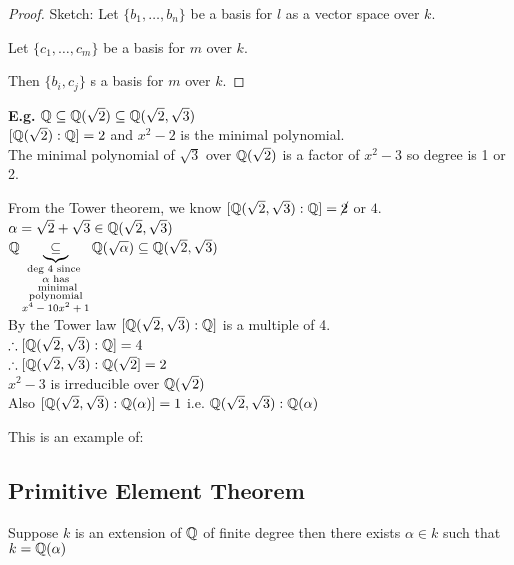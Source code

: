 \documentclass[11pt]{article}
\begin{document}
\begin{proof}
	Sketch: Let $\{ b_1, \dots, b_n \}$ be a basis for $l$ as a vector space over $k$.

	Let $\{c_1, \dots, c_m \}$ be a basis for $m$ over $k$.

	Then $\{ b_i, c_j\}$ s a basis for $m$ over $k$.
\end{proof}
$ $\\
\textbf{E.g.} $\mathbb{Q} \subseteq \mathbb{Q}(\sqrt{2}) \subseteq \mathbb{Q}(\sqrt{2},\sqrt{3}) $
$ $\\[-0.5em]

$[\mathbb{Q}(\sqrt{2}) : \mathbb{Q}] = 2 $ and $x^2 - 2$ is the minimal polynomial.
$ $\\[-0.5em]

The minimal polynomial of $\sqrt{3} $ over $\mathbb{Q}(\sqrt{2})$ is a factor of $x^2 -3$ so degree is 1 or 2.

From the Tower theorem, we know $[\mathbb{Q}(\sqrt{2},\sqrt{3}):\mathbb{Q}] = \cancel{2}$ or $4$.
$ $\\[-.5em]

$\alpha = \sqrt{2} + \sqrt{3} \in \mathbb{Q} (\sqrt{2}, \sqrt{3})$
$ $\\[-.5em]

$\mathbb{Q} \underbrace{\subseteq}_{\substack{\text{deg 4 since } \\ \text{$\alpha$ has} \\ \text{ minimal} \\ \text{polynomial}\\ \text{$x^4 -10x^2 + 1$} }} \mathbb{Q}(\sqrt{\alpha}) \subseteq \mathbb{Q}(\sqrt{2},\sqrt{3}) $
$ $\\

By the Tower law $[\mathbb{Q}(\sqrt{2},\sqrt{3}): \mathbb{Q}]$ is a multiple of 4.
$ $\\[-.5em]

$ \therefore [\mathbb{Q}(\sqrt{2},\sqrt{3}): \mathbb{Q}] = 4$
$ $\\[-.5em]

$ \therefore [\mathbb{Q}(\sqrt{2},\sqrt{3}): \mathbb{Q}(\sqrt{2}] = 2$
$ $\\[-0.5em]

$x^2 - 3$ is irreducible over $\mathbb{Q}(\sqrt{2})$
$ $\\[-0.5em]

Also $ [\mathbb{Q}(\sqrt{2},\sqrt{3}): \mathbb{Q}(\alpha)] = 1$ i.e. $\mathbb{Q}(\sqrt{2},\sqrt{3}): \mathbb{Q}(\alpha)$

$ $\\[-.5em]
This is an example of:

\subsection{Primitive Element Theorem}
\begin{theorem}
	Suppose $k$ is an extension of $\mathbb{Q}$ of finite degree then there exists $\alpha \in k$ such that $k = \mathbb{Q}(\alpha)$
\end{theorem}
\end{document}
